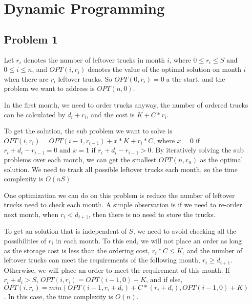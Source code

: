 \documentclass[paper=a4, fontsize=11pt]{scrartcl} %
\numberwithin{equation}{section} %
\numberwithin{figure}{section} %
\numberwithin{table}{section} %
\begin{document}
\section*{Dynamic Programming}


\subsection*{Problem 1}



Let $r_i$ denotes the number of leftover trucks in month $i$, where $0 \leq r_i \leq S$ and $0 \leq i \leq n$, and $OPT(i, r_i)$ denotes the value of the optimal solution on month $i$ when there are $r_i$ leftover trucks. So $OPT(0, r_i) = 0$ a the start, and the problem we want to address is $OPT(n, 0)$.

In the first month, we need to order trucks anyway, the number of ordered trucks can be calculated by $d_i + r_i$, and the cost is $K + C*r_i$. 

To get the solution, the sub problem we want to solve is $OPT(i, r_i) = OPT(i - 1, r_{i - 1}) + x*K + r_i*C$, where $x = 0$ if $r_i + d_i - r_{i-1} = 0$ and $x = 1$ if $r_i + d_i - r_{i-1} > 0$. By iteratively solving the sub problems over each month, we can get the smallest $OPT(n, r_n)$ as the optimal solution. We need to track all possible leftover trucks each month, so the time complexity is $O(nS)$.

One optimization we can do on this problem is reduce the number of leftover trucks need to check each month. A simple observation is if we need to re-order next month, when $r_i < d_{i+1}$, then there is no need to store the trucks. 

To get an solution that is independent of $S$, we need to avoid checking all the possibilities of $r_i$ in each month. To this end, we will not place an order as long as the storage cost is less than the ordering cost, $r_i * C \leq K$, and the number of leftover trucks can meet the requirements of the following month, $r_i \geq d_{i+1}$. Otherwise, we will place an order to meet the requirement of this month. If $r_i+d_i > S$, $OPT(i, r_i) = OPT(i-1, 0) + K$, and if else, $OPT(i, r_i) = min(OPT(i-1, r_i + d_i) + C*(r_i + d_i), OPT(i-1, 0) + K)$.
In this case, the time complexity is $O(n)$.
\end{document}
